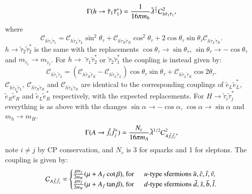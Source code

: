 \documentclass[final,3p,times]{elsarticle}
\begin{document}
\begin{equation}\label{hstau1stau1}
\Gamma(h \rightarrow \tilde{\tau}_1 {\tilde{\tau}}_1^*) = {1 \over 16 \pi m_h} \tilde{\lambda}^{1 \over 2} \mathcal{C}_{h \tilde{\tau}_{1} \tilde{\tau}_{1}}^2,
\end{equation} 
where
\begin{equation}
\mathcal{C}_{h \tilde{\tau}_{1} \tilde{\tau}_{1}} = \mathcal{C}_{h \tilde{\tau}_{L} \tilde{\tau}_{L}} \sin^2 \theta_\tau + \mathcal{C}_{h \tilde{\tau}_{R} \tilde{\tau}_{R}} \cos^2 \theta_\tau + 2 \cos\theta_\tau \sin\theta_\tau \mathcal{C}_{h \tilde{\tau}_{L} \tilde{\tau}_{R}}.
\end{equation}
$h \rightarrow \tilde{\tau}_2 {\tilde{\tau}}_2^*$ is the same with the replacements $\cos\theta_\tau \rightarrow \sin\theta_\tau$, $\sin\theta_\tau \rightarrow -\cos\theta_\tau$ and $m_{\tilde{\tau}_1} \rightarrow m_{\tilde{\tau}_2}$.
For $h \rightarrow$ $\tilde{\tau}_1 {\tilde{\tau}}_2^*$ or $\tilde{\tau}_2 {\tilde{\tau}}_1^*$ the coupling is instead given by:
\begin{equation}
\mathcal{C}_{h \tilde{\tau}_{1} \tilde{\tau}_{2}} = (\mathcal{C}_{h \tilde{\tau}_{R} \tilde{\tau}_{R}} - \mathcal{C}_{h \tilde{\tau}_{L} \tilde{\tau}_{L}})\cos\theta_\tau \sin\theta_\tau + \mathcal{C}_{h \tilde{\tau}_{L} \tilde{\tau}_{R}} \cos 2\theta_\tau.
\end{equation}
$\mathcal{C}_{h \tilde{\tau}_{L} \tilde{\tau}_{L}}$, $\mathcal{C}_{h \tilde{\tau}_{R} \tilde{\tau}_{R}}$ and $\mathcal{C}_{h \tilde{\tau}_{L} \tilde{\tau}_{R}}$ are identical to the corresponding couplings of $\tilde{e}_L {\tilde{e}}_L^*$, $\tilde{e}_R {\tilde{e}}_R^*$ and $\tilde{e}_L {\tilde{e}}_R^*$ respectively, with the expected replacements.
For $H \rightarrow \tilde{\tau}_i {\tilde{\tau}}_j^*$ everything is as above with the changes $\sin\alpha \rightarrow -\cos\alpha$, $\cos\alpha \rightarrow \sin\alpha$ and $m_h \rightarrow m_H$.
\begin{equation} \label{Afifj}
\Gamma(A \rightarrow \tilde{f}_i {\tilde{f}}_j^*) = {N_c \over 16 \pi m_A} \tilde{\lambda}^{1/2} \mathcal{C}_{A \tilde{f}_{i} \tilde{f}_{j}}^2,
\end{equation}
note $i\neq j$ by CP conservation, and $N_c$ is 3 for squarks and 1 for
sleptons. The coupling is given by:
\begin{equation}
\mathcal{C}_{A \tilde{f}_{i} \tilde{f}_{j}} = \begin{cases}
			{g m_f \over 2 m_W}(\mu + A_f \cot \beta), $  for$ \: \: & u$-type sfermions $\tilde{u}, \tilde{c}, \tilde{t}, \tilde{\nu,} \\
			{g m_f \over 2 m_W}(\mu + A_f \tan \beta), $  for$ \: \: & d$-type sfermions $\tilde{d}, \tilde{s}, \tilde{b}, \tilde{l}. \\
			\end{cases}
\end{equation}
\end{document}
